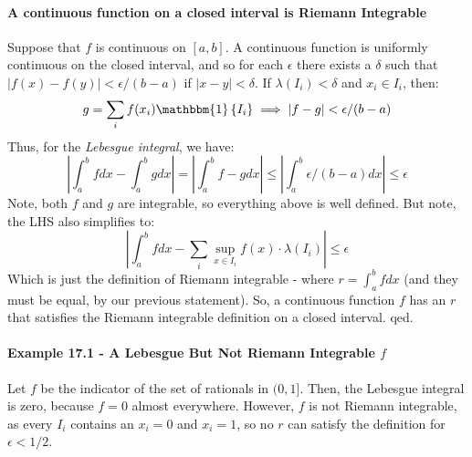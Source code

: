\documentclass[12pt,a4paper]{article}
\newcommand{\1}[1]{\mathbbm{1}\left\{ #1 \right\}}
\begin{document}
\paragraph{A continuous function on a closed interval is Riemann Integrable} Suppose that $f$ is continuous on $[a,b]$. A continuous function is uniformly continuous on the closed interval, and so for each $\epsilon$ there exists a $\delta$ such that $|f(x) - f(y)| < \epsilon/(b-a)$ if $|x - y| < \delta$. If $\lambda(I_i) < \delta$ and $x_i \in I_i$, then:
$$
	g = \sum_i f(x_i) \1{I_i} \implies
	|f - g| < \epsilon/(b-a)
$$
Thus, for the \textit{Lebesgue integral}, we have:
$$
	\left|\int_a^b fdx - \int_a^b gdx\right| = \left|\int_a^b f - g dx\right| \leq 
	\left|\int_a^b \epsilon/(b-a) dx\right| \leq \epsilon
$$
Note, both $f$ and $g$ are integrable, so everything above is well defined. But note, the LHS also simplifies to:
$$
	\left|\int_a^b fdx - \sum_i \sup_{x \in I_i} f(x) \cdot \lambda(I_i)\right| \leq \epsilon
$$
Which is just the definition of Riemann integrable - where $r = \int_a^b fdx$ (and they must be equal, by our previous statement). So, a continuous function $f$ has an $r$ that satisfies the Riemann integrable definition on a closed interval. qed.

\paragraph{Example 17.1 - A Lebesgue But Not Riemann Integrable $f$} Let $f$ be the indicator of the set of rationals in $(0,1]$. Then, the Lebesgue integral is zero, because $f = 0$ almost everywhere. However, $f$ is not Riemann integrable, as every $I_i$ contains an $x_i = 0$ and $x_i = 1$, so no $r$ can satisfy the definition for $\epsilon < 1/2$. 
\end{document}
